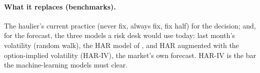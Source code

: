 \paragraph{What it replaces (benchmarks).} The haulier's current practice (never fix, always fix, fix half)
for the decision; and, for the forecast, the three models a risk desk would use today: last month's
volatility (random walk), the HAR model of \citet{corsi2009}, and HAR augmented with the option-implied
volatility (HAR-IV), the market's own forecast. HAR-IV is the bar the machine-learning models must clear.
